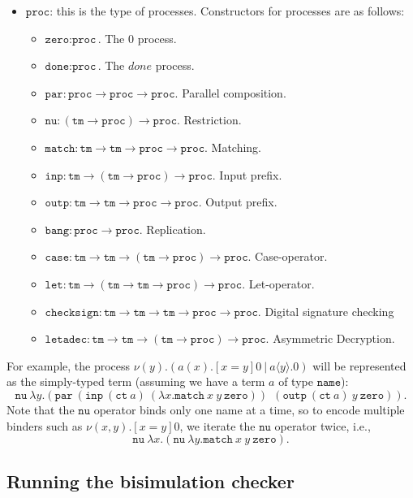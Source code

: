 \documentclass{article}
\newcommand\obj[1]{\texttt{#1}}
\begin{document}
\begin{itemize}
\item $\obj{proc}$: this is the type of processes. Constructors for processes are as follows:
\begin{itemize}
\item $\obj{zero} : \obj{proc}$. The $0$ process.
\item $\obj{done} : \obj{proc}$. The $done$ process.
\item $\obj{par} : \obj{proc} \to \obj{proc} \to \obj{proc}$. Parallel composition.
\item $\obj{nu} : (\obj{tm} \to \obj{proc}) \to \obj{proc}$. Restriction. 
\item $\obj{match} : \obj{tm} \to \obj{tm} \to \obj{proc} \to \obj{proc}$. Matching.
\item $\obj{inp} : \obj{tm} \to (\obj{tm} \to \obj{proc}) \to \obj{proc}$. Input prefix.
\item $\obj{outp} : \obj{tm} \to \obj{tm} \to \obj{proc} \to \obj{proc}$. Output prefix.
\item $\obj{bang} : \obj{proc} \to \obj{proc}$. Replication.
\item $\obj{case} : \obj{tm} \to \obj{tm} \to (\obj{tm} \to \obj{proc}) \to \obj{proc}$. Case-operator.
\item $\obj{let} : \obj{tm} \to (\obj{tm} \to \obj{tm} \to \obj{proc}) \to \obj{proc}$. Let-operator.
\item $\obj{checksign} : \obj{tm} \to \obj{tm} \to \obj{tm} \to \obj{proc} \to \obj{proc}$. Digital signature checking
\item $\obj{letadec} : \obj{tm} \to \obj{tm} \to (\obj{tm} \to \obj{proc}) \to \obj{proc}$. Asymmetric Decryption.
\end{itemize}

\end{itemize}
For example, the process $\nu (y).(a(x).[x = y] 0 ~|~ a\langle y\rangle.0)$ will be represented
as the simply-typed term (assuming we have a term $a$ of type $\obj{name}$):
$$
\obj{nu} ~ \lambda y. (\obj{par}~ (\obj{inp}~(\obj{ct}~a)~(\lambda x. \obj{match}~x~y~\obj{zero}))
~~ (\obj{outp}~ (\obj{ct}~a) ~ y ~ \obj{zero})).
$$
Note that the $\obj{nu}$ operator binds only one name at a time, so to encode
multiple binders such as $\nu (x,y).[x=y]0$, we iterate the $\obj{nu}$ operator twice, i.e.,
$$
\obj{nu}~\lambda x.(\obj{nu}~\lambda y.\obj{match}~x~y~\obj{zero}).
$$
\subsection{Running the bisimulation checker}
\end{document}

